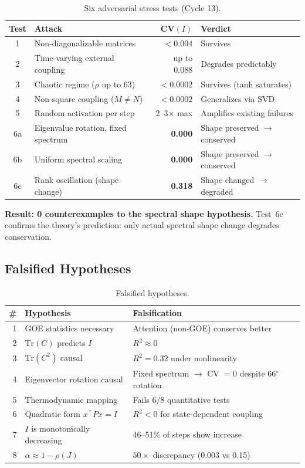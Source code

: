 \documentclass[11pt]{article}
\begin{document}
\begin{table}[h]
  \centering
  \caption{Six adversarial stress tests (Cycle 13).}
  \label{tab:stress}
  \begin{tabular}{clrl}
    \toprule
    Test & Attack & CV$(I)$ & Verdict \\
    \midrule
    1   & Non-diagonalizable matrices       & $< 0.004$  & Survives \\
    2   & Time-varying external coupling     & up to 0.088 & Degrades predictably \\
    3   & Chaotic regime ($\rho$ up to 63)  & $< 0.0002$ & Survives (tanh saturates) \\
    4   & Non-square coupling ($M \neq N$)  & $< 0.0002$ & Generalizes via SVD \\
    5   & Random activation per step         & 2--3$\times$ max & Amplifies existing failures \\
    6a  & Eigenvalue rotation, fixed spectrum & \textbf{0.000} & Shape preserved $\to$ conserved \\
    6b  & Uniform spectral scaling           & \textbf{0.000} & Shape preserved $\to$ conserved \\
    6c  & Rank oscillation (shape change)    & \textbf{0.318} & Shape changed $\to$ degraded \\
    \bottomrule
  \end{tabular}
\end{table}

\textbf{Result: 0 counterexamples to the spectral shape hypothesis.} Test~6c confirms the theory's prediction: only actual spectral shape change degrades conservation.

\subsection{Falsified Hypotheses}

\begin{table}[h]
  \centering
  \caption{Falsified hypotheses.}
  \label{tab:falsified}
  \begin{tabular}{rll}
    \toprule
    \# & Hypothesis & Falsification \\
    \midrule
    1 & GOE statistics necessary    & Attention (non-GOE) conserves better \\
    2 & $\mathrm{Tr}(C)$ predicts $I$  & $R^2 \approx 0$ \\
    3 & $\mathrm{Tr}(C^2)$ causal     & $R^2 = 0.32$ under nonlinearity \\
    4 & Eigenvector rotation causal  & Fixed spectrum $\to$ CV $= 0$ despite 66$^\circ$ rotation \\
    5 & Thermodynamic mapping        & Fails 6/8 quantitative tests \\
    6 & Quadratic form $x^\top P x = I$ & $R^2 < 0$ for state-dependent coupling \\
    7 & $I$ is monotonically decreasing & 46--51\% of steps show increase \\
    8 & $\alpha \approx 1 - \rho(J)$ & $50\times$ discrepancy (0.003 vs 0.15) \\
    \bottomrule
  \end{tabular}
\end{table}
\end{document}
